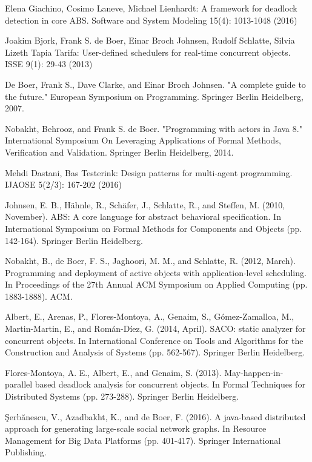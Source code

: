 \documentclass[runningheads,a4paper]{llncs}
\begin{document}
\begin{thebibliography}{4}
Elena Giachino, Cosimo Laneve, Michael Lienhardt:
A framework for deadlock detection in core ABS. Software and System Modeling 15(4): 1013-1048 (2016)


		Joakim Bjork, Frank S. de Boer, Einar Broch Johnsen, Rudolf Schlatte, Silvia Lizeth Tapia Tarifa:
		User-defined schedulers for real-time concurrent objects. ISSE 9(1): 29-43 (2013)
		
		De Boer, Frank S., Dave Clarke, and Einar Broch Johnsen. "A complete guide to the future." European Symposium on Programming. Springer Berlin Heidelberg, 2007.
		
		 Nobakht, Behrooz, and Frank S. de Boer. "Programming with actors in Java 8." International Symposium On Leveraging Applications of Formal Methods, Verification and Validation. Springer Berlin Heidelberg, 2014.
		
		 Mehdi Dastani, Bas Testerink:
		Design patterns for multi-agent programming. IJAOSE 5(2/3): 167-202 (2016)
		
		 Johnsen, E. B., Hähnle, R., Schäfer, J., Schlatte, R., and Steffen, M. (2010, November). ABS: A core language for abstract behavioral specification. In International Symposium on Formal Methods for Components and Objects (pp. 142-164). Springer Berlin Heidelberg.
		
		 Nobakht, B., de Boer, F. S., Jaghoori, M. M., and Schlatte, R. (2012, March). Programming and deployment of active objects with application-level scheduling. In Proceedings of the 27th Annual ACM Symposium on Applied Computing (pp. 1883-1888). ACM.
		
		 Albert, E., Arenas, P., Flores-Montoya, A., Genaim, S., Gómez-Zamalloa, M., Martin-Martin, E., and Román-Díez, G. (2014, April). SACO: static analyzer for concurrent objects. In International Conference on Tools and Algorithms for the Construction and Analysis of Systems (pp. 562-567). Springer Berlin Heidelberg.
		
		Flores-Montoya, A. E., Albert, E., and Genaim, S. (2013). May-happen-in-parallel based deadlock analysis for concurrent objects. In Formal Techniques for Distributed Systems (pp. 273-288). Springer Berlin Heidelberg.
		
		Şerbănescu, V., Azadbakht, K., and de Boer, F. (2016). A java-based distributed approach for generating large-scale social network graphs. In Resource Management for Big Data Platforms (pp. 401-417). Springer International Publishing.
		

\end{thebibliography}
\end{document}
